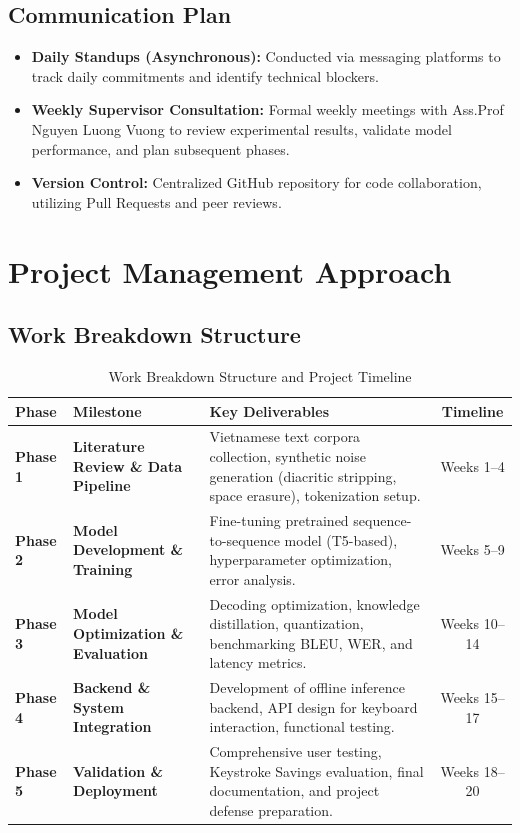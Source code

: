 \subsection{Communication Plan}
\begin{itemize}
    \item \textbf{Daily Standups (Asynchronous):} Conducted via messaging platforms to track daily commitments and identify technical blockers.
    \item \textbf{Weekly Supervisor Consultation:} Formal weekly meetings with Ass.Prof Nguyen Luong Vuong to review experimental results, validate model performance, and plan subsequent phases.
    \item \textbf{Version Control:} Centralized GitHub repository for code collaboration, utilizing Pull Requests and peer reviews.
\end{itemize}

\section{Project Management Approach}

\subsection{Work Breakdown Structure}
\begin{table}[H]
\centering
\small
\renewcommand{\arraystretch}{1.2}
\begin{tabularx}{\textwidth}{|p{1.5cm}|p{3.8cm}|X|c|}
\hline
\textbf{Phase} & \textbf{Milestone} & \textbf{Key Deliverables} & \textbf{Timeline} \\
\hline
\textbf{Phase 1} & \textbf{Literature Review \& Data Pipeline} & Vietnamese text corpora collection, synthetic noise generation (diacritic stripping, space erasure), tokenization setup. & Weeks 1--4 \\
\hline
\textbf{Phase 2} & \textbf{Model Development \& Training} & Fine-tuning pretrained sequence-to-sequence model (T5-based), hyperparameter optimization, error analysis. & Weeks 5--9 \\
\hline
\textbf{Phase 3} & \textbf{Model Optimization \& Evaluation} & Decoding optimization, knowledge distillation, quantization, benchmarking BLEU, WER, and latency metrics. & Weeks 10--14 \\
\hline
\textbf{Phase 4} & \textbf{Backend \& System Integration} & Development of offline inference backend, API design for keyboard interaction, functional testing. & Weeks 15--17 \\
\hline
\textbf{Phase 5} & \textbf{Validation \& Deployment} & Comprehensive user testing, Keystroke Savings evaluation, final documentation, and project defense preparation. & Weeks 18--20 \\
\hline
\end{tabularx}
\caption{Work Breakdown Structure and Project Timeline}
\label{tab:wbs_table}
\end{table}

